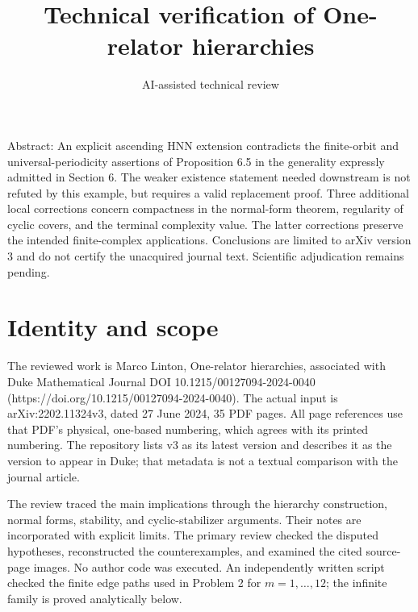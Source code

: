 \documentclass[10pt]{article}
\title{Technical verification of
One-relator hierarchies}
\author{AI-assisted technical review}
\date{}
\begin{document}
\maketitle
Abstract: An explicit ascending HNN extension contradicts the finite-orbit and universal-periodicity assertions of Proposition 6.5 in the generality expressly admitted in Section 6. The weaker existence statement needed downstream is not refuted by this example, but requires a valid replacement proof. Three additional local corrections concern compactness in the normal-form theorem, regularity of cyclic covers, and the terminal complexity value. The latter corrections preserve the intended finite-complex applications. Conclusions are limited to arXiv version 3 and do not certify the unacquired journal text. Scientific adjudication remains pending.\par
\section*{Identity and scope}
The reviewed work is Marco Linton, One-relator hierarchies, associated with Duke Mathematical Journal DOI 10.1215/00127094-2024-0040 (https://doi.org/10.1215/00127094-2024-0040). The actual input is arXiv:2202.11324v3, dated 27 June 2024, 35 PDF pages. All page references use that PDF’s physical, one-based numbering, which agrees with its printed numbering. The repository lists v3 as its latest version and describes it as the version to appear in Duke; that metadata is not a textual comparison with the journal article.\par
The review traced the main implications through the hierarchy construction, normal forms, stability, and cyclic-stabilizer arguments. Their notes are incorporated with explicit limits. The primary review checked the disputed hypotheses, reconstructed the counterexamples, and examined the cited source-page images. No author code was executed. An independently written script checked the finite edge paths used in Problem 2 for \(m=1,\ldots,12\); the infinite family is proved analytically below.\par
\end{document}
